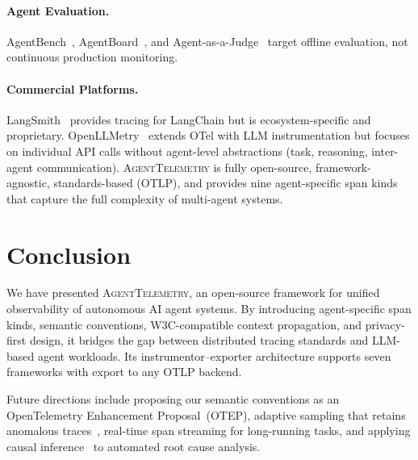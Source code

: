 \documentclass[sigplan,10pt,screen]{acmart}
\begin{document}
\paragraph{Agent Evaluation.}
AgentBench~\cite{agentbench}, AgentBoard~\cite{agentboard}, and
Agent-as-a-Judge~\cite{agent_as_judge} target offline evaluation, not
continuous production monitoring.

\paragraph{Commercial Platforms.}
LangSmith~\cite{langsmith} provides tracing for LangChain but is
ecosystem-specific and proprietary.
OpenLLMetry~\cite{openllmetry} extends OTel with LLM instrumentation
but focuses on individual API calls without agent-level abstractions
(task, reasoning, inter-agent communication).
\textsc{AgentTelemetry} is fully open-source, framework-agnostic,
standards-based (OTLP), and provides nine agent-specific span kinds
that capture the full complexity of multi-agent systems.

\section{Conclusion}
\label{sec:conclusion}

We have presented \textsc{AgentTelemetry}, an open-source framework
for unified observability of autonomous AI agent systems.  By
introducing agent-specific span kinds, semantic conventions,
W3C-compatible context propagation, and privacy-first design, it
bridges the gap between distributed tracing standards and LLM-based
agent workloads.  Its instrumentor--exporter architecture supports
seven frameworks with export to any OTLP backend.

Future directions include proposing our semantic conventions as
an OpenTelemetry Enhancement Proposal~(OTEP), adaptive sampling
that retains anomalous traces~\cite{sieve_sampling}, real-time
span streaming for long-running tasks, and applying causal
inference~\cite{mulan} to automated root cause analysis.

\end{document}
